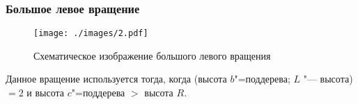 \begin{frame}
    \frametitle{Большое левое вращение}

    \begin{figure}[ht]
        \texttt{[image: ./images/2.pdf]}

        \caption{Схематическое изображение большого левого вращения}
    \end{figure}

    Данное вращение используется тогда,
    когда (высота $b$"=поддерева; $L$ "--- высота)
    $= 2$ и высота $c$"=поддерева $>$ высота $R$.
\end{frame}
